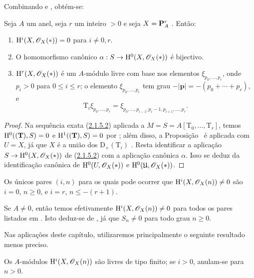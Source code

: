 Combinando  e , obtém-se:

\begin{proposition}[2.1.12]
\label{III.2.1.12}
Seja $A$ um anel, seja $r$ um inteiro $>0$ e seja $X=\mathbf{P}_A^r$ .
Então:
\begin{enumerate}
  \item[{\rm(i) }] $\mathrm{H}^i(X,\mathscr{O}_X(*))=0$ para $i\neq0,r$.
  \item[{\rm(ii) }] O homomorfismo canônico $\alpha:S\to\HH^0(X,\sh{O}_X(*))$  é bijectivo.
  \item[{\rm(iii) }] $\mathrm{H}^r(X,\mathscr{O}_X(*))$ é um $A$-módulo livre com base nos elementos $\xi_{p_0,\dots,p_r}$, onde $p_i>0$ para $0\leq i\leq r$; o elemento $\xi_{p_0,\dots,p_r}$ tem grau $-|\mathbf{p}|=-(p_0+\cdots+p_r)$, e
  \[
    \mathrm{T}_i\xi_{p_0,\dots,p_r}
    =\xi_{p_0,\dots,p_{i-1},p_i-1,p_{i+1},\dots,p_r}.
  \]
\end{enumerate}
\end{proposition}

\begin{proof}
Na sequência exata (\hyperref[III.2.1.5.2]{2.1.5.2}) aplicada a $M=S=A[\mathrm{T}_0,\dots,\mathrm{T}_r]$, temos $\mathrm{H}^0((\mathbf{T}),S)=0$ e $\mathrm{H}^1((\mathbf{T}),S)=0$ por ; além disso, a Proposição~ é aplicada com $U=X$, já que $X$ é a união dos $\mathrm{D}_+(\mathrm{T}_i)$ .
Resta identificar a aplicação $S\to\HH^0(X,\sh{O}_X(*))$ de (\hyperref[III.2.1.5.2]{2.1.5.2}) com a aplicação canônica $\alpha$.
Isso se deduz da identificação canônica de $\mathrm{H}^0(U,\mathscr{O}_X(*))$ e $\mathrm{H}^0(\mathfrak{U},\mathscr{O}_X(*))$.
\end{proof}

\begin{corollary}[2.1.13]
\label{III.2.1.13}
Os únicos pares $(i,n)$ para os quais pode ocorrer que $\mathrm{H}^i(X,\mathscr{O}_X(n))\neq0$ são $i=0$, $n\geq0$, e $i=r$, $n\leq-(r+1)$.
\end{corollary}

Se $A\neq0$, então temos efetivamente $\mathrm{H}^i(X,\mathscr{O}_X(n))\neq0$ para todos os pares listados em .
Isto deduz-se de , já que $S_n\neq0$ para todo grau $n\geq0$.

Nas aplicações deste capítulo, utilizaremos principalmente o seguinte resultado menos preciso.

\begin{corollary}[2.1.14]
\label{III.2.1.14}
Os $A$-módulos $\mathrm{H}^i(X,\mathscr{O}_X(n))$ são livres de tipo finito; se $i>0$, anulam-se para $n>0$.
\end{corollary}

